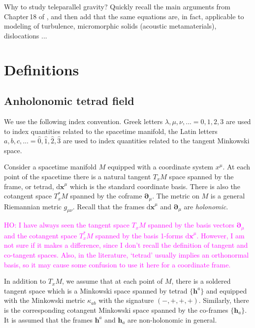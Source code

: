 \documentclass[
10pt, %
a4paper, %
oneside, %
headinclude,footinclude, %
BCOR5mm, %
]{scrartcl}
\newcommand{\mg}[1]{\kappa_{#1}}			%
\newcommand{\pdd}[1]{{\bm{\partial}_{#1}}}
\newcommand{\dx}[1]{{\bm{\mathrm{d}x}^{#1}}}
\newcommand{\bas}[1]{\bm{h}^{#1}}
\newcommand{\cobas}[1]{\bm{h}_{#1}}
\newcommand{\ho}[1]{\textcolor{magenta}{HO: #1}}
\begin{document}
Why to study teleparallel gravity? Quickly recall the main arguments from Chapter\,18 of 
\cite{AldrovandiPereiraBook}, and then add that the same equations are, in fact, applicable to 
modeling of 
turbulence, micromorphic solids (acoustic metamaterials), dislocations 
\cite{Torsion2019}... 

\section{Definitions}

\subsection{Anholonomic tetrad field}

We use the following index convention. Greek letters $ \lambda,\mu,\nu,... =0,1,2,3
$ are used to index quantities related to the spacetime manifold, the Latin letters $ a,b,c,... 
=\hat{0},\hat{1},\hat{2},\hat{3}$ are used to index quantities related to the tangent Minkowski 
space.



Consider a spacetime manifold $ M $ equipped with a coordinate system $ x^\mu $. At each point of 
the spacetime there is a natural tangent $ T_{x}M $ space spanned by the frame, or tetrad, $ 
\dx{\mu} $ which is the standard coordinate basis. 
There is also the cotangent space $ T_x^*M $ spanned by the coframe $ \pdd{\mu} $.
The metric on $ M $ is a general Riemannian metric $ g_{\mu\nu} $. 
Recall that the frames $ \dx{\mu} $ and $ \pdd{\mu} $ are \emph{holonomic}.

\ho{I have always seen the tangent space $ T_{x}M $ spanned by the basis vectors
$ \pdd{\mu} $ and the cotangent space $ T_x^*M $ spanned by the basis 1-forms $ \dx{\mu} $.
However, I am not sure if it makes a difference, since I don't recall the definition of tangent
and co-tangent spaces. Also, in the literature, `tetrad' usually implies an orthonormal
basis, so it may cause some confusion to use it here for a coordinate frame.}

In addition to $ T_{x}M $, we assume that at each point of $ M $, there is a soldered tangent space 
which is a Minkowski space spanned by tetrad $ \{ \bas{a} \}$ and equipped with the 
Minkowski metric $ \mg{ab} $ with the signature $ 
(-,+,+,+) $. Similarly, there is the 
corresponding cotangent Minkowski space spanned by the co-frames $ \{ \cobas{a} \}$. It is assumed 
that the frames $ \bas{a} $ and $ \cobas{a} $ are non-holonomic in general.
\end{document}
